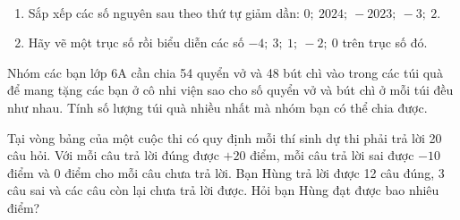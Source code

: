 \begin{bt} 
	\
	\begin{enumerate}
		\item Sắp xếp các số nguyên sau theo thứ tự giảm dần: $0 ;\  2024 ;\ -2023 ;\ -3 ;\ 2$.
		\item Hãy vẽ một trục số rồi biểu diễn các số $-4 ;\ 3 ;\ 1 ;\ -2 ;\ 0$ trên trục số đó.
	\end{enumerate}
	
\end{bt}



\begin{bt}Nhóm các bạn lớp 6A cần chia 54 quyển vở và 48 bút chì vào trong các túi quà để mang tặng các bạn ở cô nhi viện sao cho số quyển vở và bút chì ở mỗi túi đều như nhau. Tính số lượng túi quà nhiều nhất mà nhóm bạn có thể chia được.
	
\end{bt}


\begin{bt}
	Tại vòng bảng của một cuộc thi có quy định mỗi thí sinh dự thi phải trả lời 20 câu hỏi. Với mỗi câu trả lời đúng được $+20$ điểm, mỗi câu trả lời sai được $-10$ điểm và 0 điểm cho mỗi câu chưa trả lời. Bạn Hùng trả lời được 12 câu đúng, 3 câu sai và các câu còn lại chưa trả lời được. Hỏi bạn Hùng đạt được bao nhiêu điểm?
	
\end{bt}


